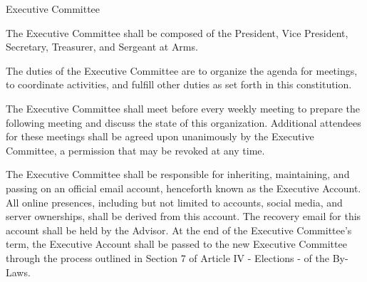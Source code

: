 {
\begin{article}{Executive Committee}
	\item The Executive Committee shall be composed of the President, Vice President, Secretary, Treasurer, and Sergeant at Arms.
	\item The duties of the Executive Committee are to organize the agenda for meetings, to coordinate activities, and fulfill other duties as set forth in this constitution.
	\item The Executive Committee shall meet before every weekly meeting to prepare the following meeting and discuss the state of this organization.  Additional attendees for these meetings shall be agreed upon unanimously by the Executive Committee, a permission that may be revoked at any time.
	\item The Executive Committee shall be responsible for inheriting, maintaining, and passing on an official email account, henceforth known as the Executive Account. All online presences, including but not limited to accounts, social media, and server ownerships, shall be derived from this account. The recovery email for this account shall be held by the Advisor. At the end of the Executive Committee’s term, the Executive Account shall be passed to the new Executive Committee through the process outlined in Section 7 of Article IV - Elections - of the By-Laws.
\end{article}
}